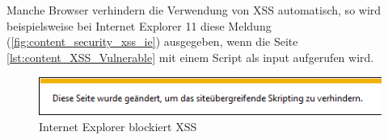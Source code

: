 Manche Browser verhindern die Verwendung von XSS automatisch, so wird beispielsweise bei Internet Explorer 11 diese Meldung (\autoref{fig:content_security_xss_ie}) ausgegeben, wenn die Seite \autoref{lst:content_XSS_Vulnerable} mit einem Script als input aufgerufen wird.

\begin{figure}[H]
\centering
\includegraphics[keepaspectratio=true, width=14cm]{images/screenshots/xss_ie.png}
\caption{Internet Explorer blockiert XSS}
\label{fig:content_security_xss_ie}
\end{figure}